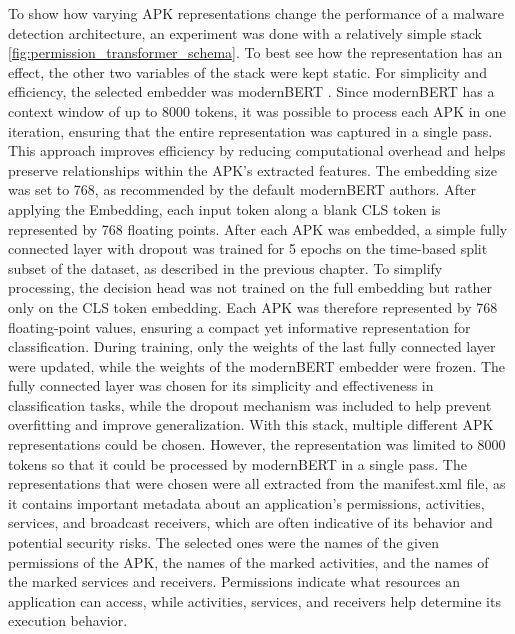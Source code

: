 To show how varying APK representations change the performance of a malware detection 
architecture, an experiment was done with a relatively simple stack \ref{fig:permission_transformer_schema}. 
To best see how the representation has an effect, 
the other two variables of the stack were kept static. 
For simplicity and efficiency, the selected embedder was modernBERT \cite{modernbert}. 
Since modernBERT has a context window of up to 8000 tokens, 
it was possible to process each APK in one iteration, 
ensuring that the entire representation was captured in a single pass. 
This approach improves efficiency by reducing computational overhead and helps preserve 
relationships within the APK's extracted features. 
The embedding size was set to 768, as recommended by the default modernBERT authors. 
After applying the Embedding, each input token along a blank CLS token is represented
by 768 floating points.
After each APK was embedded, a simple fully connected layer with dropout was 
trained for 5 epochs on the time-based 
split subset of the dataset, as described in the previous chapter. 
To simplify processing, the decision head was not trained on the full 
embedding but rather only on the CLS token embedding. Each APK was therefore 
represented by 768 floating-point values, ensuring a compact yet 
informative representation for classification.
During training, only the weights of the last fully connected layer were updated, 
while the weights of the modernBERT embedder were frozen.
The fully connected layer was chosen for its simplicity and effectiveness in 
classification tasks, while the dropout mechanism was included to help prevent overfitting 
and improve generalization. With this stack, 
multiple different APK representations could be chosen. 
However, the representation was limited to 8000 tokens so that it could be 
processed by modernBERT in a single pass. 
The representations that were chosen were all extracted from the manifest.xml file, 
as it contains important metadata about an application's permissions, activities, services, 
and broadcast receivers, which are often indicative of its behavior and potential security risks. 
The selected ones were the names of the given permissions of the APK, 
the names of the marked activities, 
and the names of the marked services and receivers. 
Permissions indicate what resources an application can access, 
while activities, services, and receivers help determine its execution behavior. 

